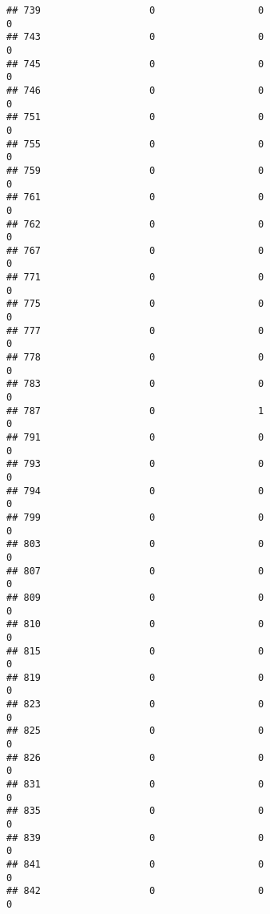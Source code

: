 \documentclass[
]{article}
\begin{document}
\begin{verbatim}
## 739                   0                  0                              0
## 743                   0                  0                              0
## 745                   0                  0                              0
## 746                   0                  0                              0
## 751                   0                  0                              0
## 755                   0                  0                              0
## 759                   0                  0                              0
## 761                   0                  0                              0
## 762                   0                  0                              0
## 767                   0                  0                              0
## 771                   0                  0                              0
## 775                   0                  0                              0
## 777                   0                  0                              0
## 778                   0                  0                              0
## 783                   0                  0                              0
## 787                   0                  1                              0
## 791                   0                  0                              0
## 793                   0                  0                              0
## 794                   0                  0                              0
## 799                   0                  0                              0
## 803                   0                  0                              0
## 807                   0                  0                              0
## 809                   0                  0                              0
## 810                   0                  0                              0
## 815                   0                  0                              0
## 819                   0                  0                              0
## 823                   0                  0                              0
## 825                   0                  0                              0
## 826                   0                  0                              0
## 831                   0                  0                              0
## 835                   0                  0                              0
## 839                   0                  0                              0
## 841                   0                  0                              0
## 842                   0                  0                              0

\end{verbatim}
\end{document}
